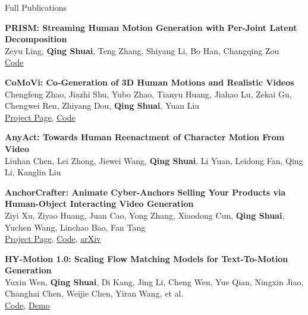 \begin{rSection}{Full Publications}

    {\bf PRISM: Streaming Human Motion Generation with Per-Joint Latent Decomposition}\hfill{ } \\
    Zeyu Ling, \textbf{Qing Shuai}, Teng Zhang, Shiyang Li, Bo Han, Changqing Zou\\
    \href{https://github.com/ZeyuLing/PRISM}{Code}

    {\bf CoMoVi: Co-Generation of 3D Human Motions and Realistic Videos}\hfill{ } \\
    Chengfeng Zhao, Jiazhi Shu, Yubo Zhao, Tianyu Huang, Jiahao Lu, Zekai Gu, Chengwei Ren, Zhiyang Dou, \textbf{Qing Shuai}, Yuan Liu\\
    \href{https://igl-hkust.github.io/CoMoVi/}{Project Page}, \href{https://github.com/IGL-HKUST/CoMoVi}{Code}

    {\bf AnyAct: Towards Human Reenactment of Character Motion From Video}\hfill{ } \\
    Liuhan Chen, Lei Zhong, Jiewei Wang, \textbf{Qing Shuai}, Li Yuan, Leidong Fan, Qing Li, Kanglin Liu

    {\bf AnchorCrafter: Animate Cyber-Anchors Selling Your Products via Human-Object Interacting Video Generation}\hfill{ } \\
    Ziyi Xu, Ziyao Huang, Juan Cao, Yong Zhang, Xiaodong Cun, \textbf{Qing Shuai}, Yuchen Wang, Linchao Bao, Fan Tang\\
    \href{https://cangcz.github.io/Anchor-Crafter/}{Project Page}, \href{https://github.com/cangcz/AnchorCrafter}{Code}, \href{https://arxiv.org/abs/2411.17383}{arXiv}

    {\bf HY-Motion 1.0: Scaling Flow Matching Models for Text-To-Motion Generation}\hfill{ } \\
    Yuxin Wen, \textbf{Qing Shuai}, Di Kang, Jing Li, Cheng Wen, Yue Qian, Ningxin Jiao, Changhai Chen, Weijie Chen, Yiran Wang, et al.\\
    \href{https://github.com/Tencent-Hunyuan/HY-Motion-1.0}{Code}, \href{https://huggingface.co/spaces/tencent/HY-Motion-1.0}{Demo}


\end{rSection}

